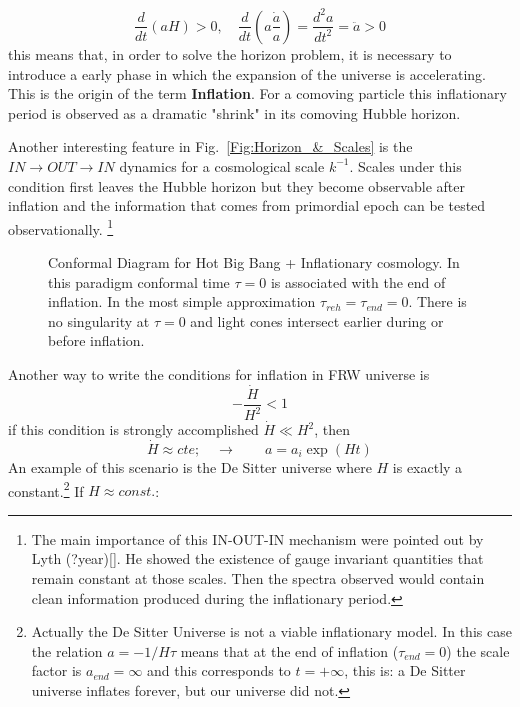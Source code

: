 \documentclass[12pt,letterpaper,twoside]{book}
\begin{document}
\begin{equation}
\frac{d}{dt}(aH) >0 , \quad  \frac{d}{dt}(a\frac{\dot{a}}{a} ) = \frac{d^2 a}{dt^2}
                                                               = \boxed{\ddot{a}>0}
\end{equation}
this means that, in order to solve the horizon problem, it is necessary to
introduce a early phase in which the expansion of the universe is
accelerating. This is the origin of the term \textbf{Inflation}. For a comoving
particle this inflationary period is observed as a dramatic "shrink" in its
comoving  Hubble horizon.

Another interesting feature in Fig.~\ref{Fig:Horizon_&_Scales} is the  $IN
\rightarrow OUT\rightarrow IN $ dynamics for a cosmological scale $k^{-1}$.
Scales under this condition first leaves the Hubble horizon but they become
observable after inflation and the information that comes from primordial epoch
can be tested observationally.  \footnote{The main importance of this IN-OUT-IN
    mechanism were pointed out by Lyth (?year)[]. He showed the existence of
    gauge invariant quantities that remain constant at those scales. Then the
    spectra observed would contain clean information produced during the
    inflationary period.}

\begin{figure}[t][tb]
    \begin{center}
        \resizebox{0.6\textwidth}{!}{}
        \caption{Conformal Diagram for Hot Big Bang + Inflationary cosmology. In
            this paradigm conformal time $\tau=0$ is associated with the end of
            inflation. In the most simple approximation
            $\tau_{reh}=\tau_{end}=0$. There is no singularity at $\tau=0$ and
            light cones intersect earlier during or before inflation.}
        \label{Fig:Inflation_Conformal}
    \end{center}
\end{figure}

Another way to write the conditions for inflation in FRW universe is
\begin{equation}
-\frac{\dot{H}}{H^2}< 1
\end{equation}
if this condition is strongly accomplished $\dot{H} \ll H^2$, then
\begin{equation}
\dot{H}\approx cte;  \quad \rightarrow \qquad a=a_i \exp(Ht)
\end{equation}
An example of this scenario is the De Sitter universe where $H$ is exactly a
constant.\footnote{ Actually the De Sitter Universe is not a viable inflationary
    model. In this case the relation $a=-1/H\tau$ means that at the end of
    inflation  ($\tau_{end}=0$) the scale factor is $a_{end}=\infty$ and this
    corresponds to $t=+\infty$, this is: a De Sitter universe inflates forever,
    but our universe did not.} If $H\approx const.$:
\end{document}
